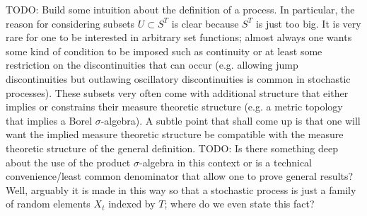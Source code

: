 TODO: Build some intuition about the definition of a process.  In
particular, the reason for considering subsets $U \subset S^T$ is
clear because $S^T$ is just too big.  It is very rare for one to be
interested in arbitrary set functions; almost always one wants some
kind of condition to be imposed such as continuity or at least some
restriction on the discontinuities that can occur (e.g. allowing jump
discontinuities but outlawing
oscillatory discontinuities is common in stochastic processes).  These
subsets very often come with additional structure that either implies or constrains their measure theoretic
structure (e.g. a metric topology that implies a Borel
$\sigma$-algebra).  A subtle point that shall come up is that one will
want the implied measure theoretic structure be compatible with the
measure theoretic structure of the general definition.
TODO: Is there something deep about the use of the product
$\sigma$-algebra in this context or is a technical convenience/least
common denominator that allow one to prove general results?  Well,
arguably it is made in this way so that a stochastic process is just a
family of random elements $X_t$ indexed by $T$; where do we even state
this fact?

